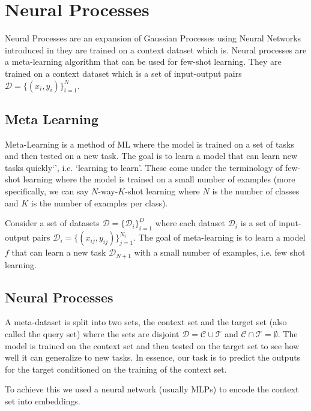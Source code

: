 \documentclass[main.tex]{subfiles}
\begin{document}
\section{Neural Processes}

Neural Processes are an expansion of Gaussian Processes using Neural Networks introduced in \cite{garnelo2018neural} they are trained on a context dataset which is. Neural processes are a meta-learning algorithm that can be used for few-shot learning. They are trained on a context dataset which is a set of input-output pairs $\mathcal{D} = \{ (x_i, y_i) \}_{i=1}^N$. 

\subsection{Meta Learning}

Meta-Learning is a method of ML where the model is trained on a set of tasks and then tested on a new task. The goal is to learn a model that can learn new tasks quickly`', i.e. `learning to learn'. These come under the terminology of few-shot learning where the model is trained on a small number of examples (more specifically, we can say $N$-way-$K$-shot learning where $N$ is the number of classes and $K$ is the number of examples per class).

Consider a set of datasets $\mathcal{D} = \{ \mathcal{D}_i \}_{i=1}^D$ where each dataset $\mathcal{D}_i$ is a set of input-output pairs $\mathcal{D}_i = \{ (x_{ij}, y_{ij}) \}_{j=1}^{N_i}$. The goal of meta-learning is to learn a model $f$ that can learn a new task $\mathcal{D}_{N+1}$ with a small number of examples, i.e. few shot learning.

\subsection{Neural Processes}

A meta-dataset is split into two sets, the context set and the target set (also called the query set) where the sets are disjoint $\mathcal{D} = \mathcal{C} \cup \mathcal{T}$ and $\mathcal{C} \cap \mathcal{T} = \emptyset$. The model is trained on the context set and then tested on the target set to see how well it can generalize to new tasks. In essence, our task is to predict the outputs for the target conditioned on the training of the context set.

To achieve this we used a neural network (usually MLPs) to encode the context set into embeddings. 
\end{document}
